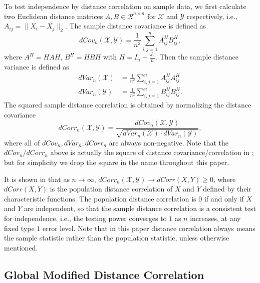 \documentclass[11pt]{article}
\begin{document}
To test independence by distance correlation on sample data, we first calculate two Euclidean distance matrices $A, B \in \mathcal{R}^{n \times n}$ for $\mathcal{X}$ and $\mathcal{Y}$ respectively, i.e., $A_{ij}=\|X_{i}-X_{j}\|_{2}$. The sample distance covariance is defined as
\begin{equation}
\label{dCovEqu}
dCov_{n}(\mathcal{X},\mathcal{Y})=\frac{1}{n^2}\sum_{i,j=1}^{n}A^{H}_{ij}B^{H}_{ij},
\end{equation}
where $A^{H}=HAH$, $B^{H}=HBH$ with $H=I_{n}-\frac{J_{n}}{n}$. Then the sample distance variance is defined as
\begin{align*}
dVar_{n}(\mathcal{X}) &=\frac{1}{n^2}\sum_{i,j=1}^{n}A^{H}_{ij}A^{H}_{ij}\\
dVar_{n}(\mathcal{Y}) &=\frac{1}{n^2}\sum_{i,j=1}^{n}B^{H}_{ij}B^{H}_{ij}.
\end{align*}
The squared sample distance correlation is obtained by normalizing the distance covariance
\begin{equation}
\label{dCorrEqu}
dCorr_{n}(\mathcal{X},\mathcal{Y})=\frac{dCov_{n}(\mathcal{X},\mathcal{Y})}{\sqrt{dVar_{n}(\mathcal{X}) \cdot dVar_{n}(\mathcal{Y})}},
\end{equation}
where all of $dCov_{n}, dVar_{n}, dCorr_{n}$ are always non-negative. Note that the $dCov_{n}/dCorr_{n}$ above is actually the square of distance covariance/correlation in \cite{SzekelyRizzoBakirov2007}; but for simplicity we drop the square in the name throughout this paper.

It is shown in \cite{SzekelyRizzoBakirov2007} that as $n \rightarrow \infty$, $dCorr_{n}(\mathcal{X},\mathcal{Y}) \rightarrow dCorr(X,Y) \geq 0$, where $dCorr(X,Y)$ is the population distance correlation of $X$ and $Y$ defined by their characteristic functions. The population distance correlation is $0$ if and only if $X$ and $Y$ are independent, so that the sample distance correlation is a consistent test for independence, i.e., the testing power converges to $1$ as $n$ increases, at any fixed type $1$ error level. Note that in this paper distance correlation always means the sample statistic rather than the population statistic, unless otherwise mentioned.

\subsection{Global Modified Distance Correlation}
\label{sec:gmd}
\end{document}
